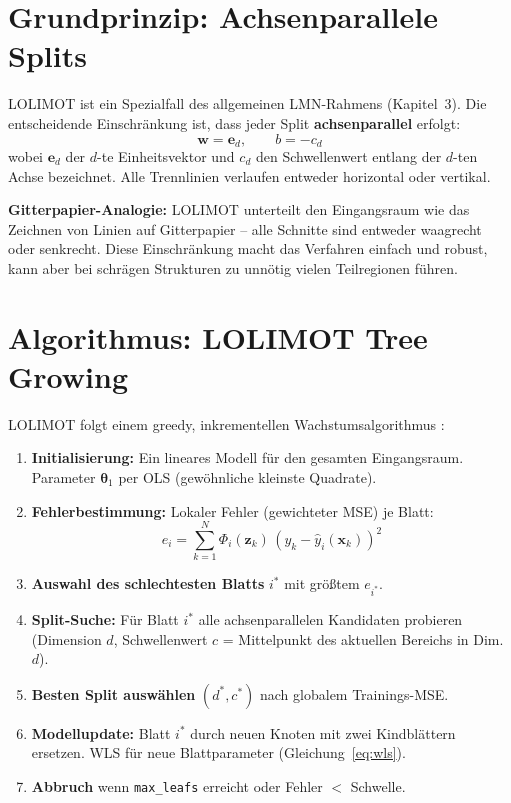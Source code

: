 \documentclass[11pt,a4paper]{report}
\begin{document}
\section{Grundprinzip: Achsenparallele Splits}
\label{sec:lolimot_splits}

LOLIMOT ist ein Spezialfall des allgemeinen LMN-Rahmens (Kapitel~3). Die entscheidende
Einschr\"{a}nkung ist, dass jeder Split \textbf{achsenparallel} erfolgt:
\begin{equation}
\mathbf{w} = \mathbf{e}_d, \qquad b = -c_d
\label{eq:lolimot_split}
\end{equation}
wobei $\mathbf{e}_d$ der $d$-te Einheitsvektor und $c_d$ den Schwellenwert entlang der $d$-ten
Achse bezeichnet. Alle Trennlinien verlaufen entweder horizontal oder vertikal.

\begin{analogiebox}
\textbf{Gitterpapier-Analogie:} LOLIMOT unterteilt den Eingangsraum wie das Zeichnen von
Linien auf Gitterpapier -- alle Schnitte sind entweder waagrecht oder senkrecht. Diese
Einschr\"{a}nkung macht das Verfahren einfach und robust, kann aber bei schr\"{a}gen Strukturen
zu unn\"{o}tig vielen Teilregionen f\"{u}hren.
\end{analogiebox}

\section{Algorithmus: LOLIMOT Tree Growing}
\label{sec:lolimot_algorithm}

LOLIMOT folgt einem greedy, inkrementellen Wachstumsalgorithmus \cite{nelles2001}:

\begin{enumerate}
\item \textbf{Initialisierung:} Ein lineares Modell f\"{u}r den gesamten Eingangsraum.
      Parameter $\boldsymbol{\theta}_1$ per OLS (gew\"{o}hnliche kleinste Quadrate).
\item \textbf{Fehlerbestimmung:} Lokaler Fehler (gewichteter MSE) je Blatt:
      \begin{equation}
          e_i = \sum_{k=1}^N \Phi_i(\mathbf{z}_k)\,(y_k - \hat{y}_i(\mathbf{x}_k))^2
          \label{eq:lolimot_local_error}
      \end{equation}
\item \textbf{Auswahl des schlechtesten Blatts} $i^*$ mit gr\"{o}\ss{}tem $e_{i^*}$.
\item \textbf{Split-Suche:} F\"{u}r Blatt $i^*$ alle achsenparallelen Kandidaten probieren
      (Dimension $d$, Schwellenwert $c$ = Mittelpunkt des aktuellen Bereichs in Dim.\ $d$).
\item \textbf{Besten Split ausw\"{a}hlen} $(d^*, c^*)$ nach globalem Trainings-MSE.
\item \textbf{Modellupdate:} Blatt $i^*$ durch neuen Knoten mit zwei Kindbl\"{a}ttern ersetzen.
      WLS f\"{u}r neue Blattparameter (Gleichung~\ref{eq:wls}).
\item \textbf{Abbruch} wenn \texttt{max\_leafs} erreicht oder Fehler $<$ Schwelle.
\end{enumerate}
\end{document}
